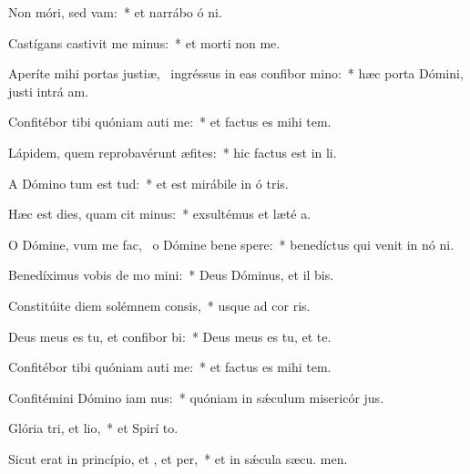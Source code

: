 \item Non móri, sed vam:~* et narrábo ó ni.
\item Castígans castivit me minus:~* et morti non  me.
\item Aperíte mihi portas justiæ,~\pscross{} ingréssus in eas confibor mino:~* hæc porta Dómini, justi intrá  am.
\item Confitébor tibi quóniam auti me:~* et factus es mihi  tem.
\item Lápidem, quem reprobavérunt æfites:~* hic factus est in  li.
\item A Dómino tum est tud:~* et est mirábile in ó tris.
\item Hæc est dies, quam cit minus:~* exsultémus et læté  a.
\item O Dómine, vum me fac,~\pscross{} o Dómine bene spere:~* benedíctus qui venit in nó ni.
\item Benedíximus vobis de mo mini:~* Deus Dóminus, et il bis.
\item Constitúite diem solémnem  consis,~* usque ad cor ris.
\item Deus meus es tu, et confibor bi:~* Deus meus es tu, et  te.
\item Confitébor tibi quóniam auti me:~* et factus es mihi  tem.
\item Confitémini Dómino iam nus:~* quóniam in sǽculum misericór jus.
\item Glória tri, et lio,~* et Spirí to.
\item Sicut erat in princípio, et , et per,~* et in sǽcula sæcu. men.
